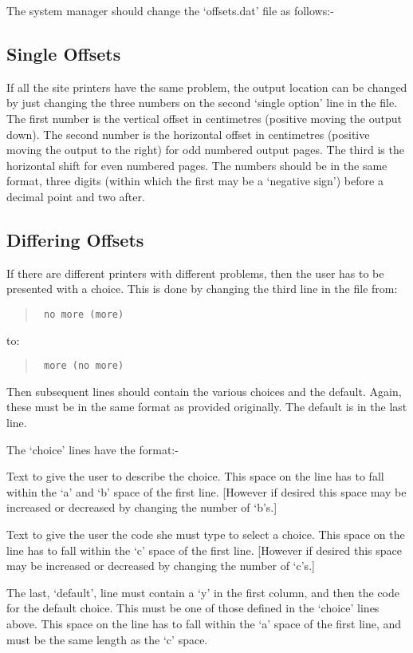 The system manager should change the `offsets.dat' file as follows:-

\subsection{Single Offsets}

If all the site printers have the same problem, the output location can be
changed by just changing the three numbers on the second `single option'
line in the file. The first number is the vertical offset in centimetres
(positive moving the output down). The second number is the horizontal
offset in centimetres (positive moving the output to the right) for odd
numbered output pages. The third is the horizontal shift for even numbered
pages. The numbers should be in the same format, three digits (within which
the first may be a `negative sign') before a decimal point and two after.

\subsection{Differing Offsets}

If there are different printers with different problems, then the user has
to be presented with a choice. This is done by changing the third line in
the file from:

\begin{quote}\tt
no more     (more)
\end{quote}
to:
\begin{quote}\tt
more     (no more)
\end{quote}

Then subsequent lines should contain the various choices and the default.
Again, these must be in the same format as provided originally. The default
is in the last line.

The `choice' lines have the format:-

Text to give the user to describe the choice. This space on the line has to
fall within the `a' and `b' space of the first line. [However if desired
this space may be increased or decreased by changing the number of `b's.]

Text to give the user the code she must type to select a choice. This space
on the line has to fall within the `c' space of the first line. [However if
desired this space may be increased or decreased by changing the number of
`c's.]

The last, `default', line must contain a `y' in the first column, and then
the code for the default choice. This must be one of those defined in the
`choice' lines above. This space on the line has to fall within the `a'
space of the first line, and must be the same length as the `c' space.


